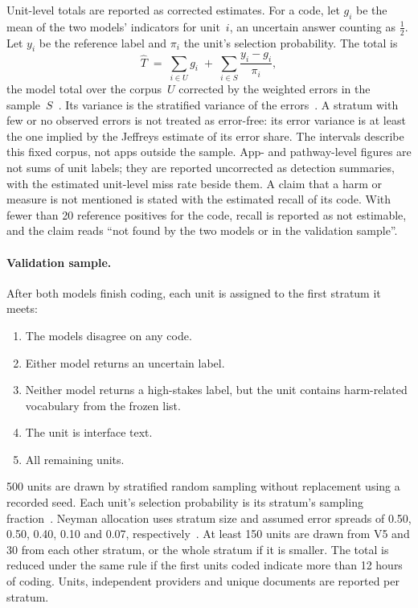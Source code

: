 Unit-level totals are reported as corrected estimates. For a code, let $g_i$ be the mean of the
two models' indicators for unit~$i$, an uncertain answer counting as $\tfrac12$. Let $y_i$ be
the reference label and $\pi_i$ the unit's selection probability. The total is
\[
  \hat T \;=\; \sum_{i\in U} g_i \;+\; \sum_{i\in S}\frac{y_i-g_i}{\pi_i},
\]
the model total over the corpus~$U$ corrected by the weighted errors in the
sample~$S$~\parencite[\S4]{egami2023using}\parencite{angelopoulos2023prediction}. Its variance is
the stratified variance of the errors~\parencite[ch.~3]{lohr2021sampling}. A stratum with few or
no observed errors is not treated as error-free: its error variance is at least the one implied
by the Jeffreys estimate of its error share. The intervals describe this fixed corpus, not apps
outside the sample. App- and pathway-level figures are not sums of unit
labels; they are reported uncorrected as detection summaries, with the estimated unit-level miss
rate beside them. A claim that a harm or measure is not mentioned is stated with the estimated
recall of its code. With fewer than 20 reference positives for the code, recall is reported as
not estimable, and the claim reads \enquote{not found by the two models or in the validation
sample}.

\paragraph{Validation sample.} After both models finish coding, each unit is assigned to the
first stratum it meets:
\begin{enumerate}[label=\textbf{V\arabic*},leftmargin=2.4em,itemsep=0pt,topsep=3pt]
  \item The models disagree on any code.
  \item Either model returns an uncertain label.
  \item Neither model returns a high-stakes label, but the unit contains harm-related vocabulary
    from the frozen list.
  \item The unit is interface text.
  \item All remaining units.
\end{enumerate}
500 units are drawn by stratified random sampling without replacement using a recorded seed.
Each unit's selection probability is its stratum's sampling
fraction~\parencite[chs.~3, 6]{lohr2021sampling}\parencite{egami2023using}. Neyman allocation uses
stratum size and assumed error spreads of 0.50, 0.50, 0.40, 0.10 and 0.07,
respectively~\parencite{fisch2024stratified,gligoric2025unconfident,lohr2021sampling,zrnic2024active}.
At least 150 units are drawn from V5 and 30 from each other stratum, or the whole stratum if it is
smaller. The total is reduced under the same rule if the first units coded indicate more than
12 hours of coding. Units, independent providers and unique documents are reported per stratum.


